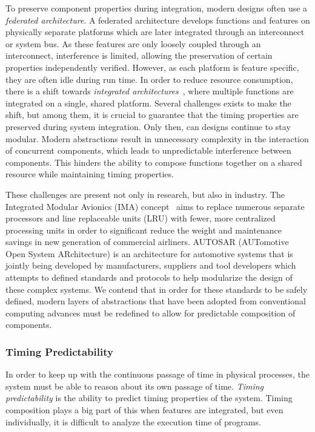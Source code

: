 To preserve component properties during integration, modern designs often use a \textit{federated architecture}.
A federated architecture develops functions and features on physically separate platforms which are later integrated through an interconnect or system bus. 
As these features are only loosely coupled through an interconnect, interference is limited, allowing the preservation of certain properties independently verified. 
However, as each platform is feature specific, they are often idle during run time.
In order to reduce resource consumption, there is a shift towards \textit{integrated architectures}~\cite{Obermaisser2009FedtoIMA,AvionicsWatkins2007IMA}, where multiple functions are integrated on a single, shared platform.
Several challenges exists to make the shift, but among them, it is crucial to guarantee that the timing properties are preserved during system integration.
Only then, can designs continue to stay modular. 
Modern abstractions result in unnecessary complexity in the interaction of concurrent components, which leads to unpredictable interference between components. 
This hinders the ability to compose functions together on a shared resource while maintaining timing properties. 

These challenges are present not only in research, but also in industry.  
The Integrated Modular Avionics (IMA) concept~\cite{IMA} aims to replace numerous separate processors and line replaceable units (LRU) with fewer, more centralized processing units in order to significant reduce the weight and maintenance savings in new generation of commercial airliners.
AUTOSAR (AUTomotive Open System ARchitecture)\cite{autosarsite} is an architecture for automotive systems that is jointly being developed by manufacturers, suppliers and tool developers which attempts to defined standards and protocols to help modularize the design of these complex systems.
We contend that in order for these standards to be safely defined, modern layers of abstractions that have been adopted from conventional computing advances must be redefined to allow for  predictable composition of components.  

\subsubsection{Timing Predictability}
In order to keep up with the continuous passage of time in physical processes, the system must be able to reason about its own passage of time.
\textit{Timing predictability} is the ability to predict timing properties of the system.
Timing composition plays a big part of this when features are integrated, but even individually, it is difficult to analyze the execution time of programs.

